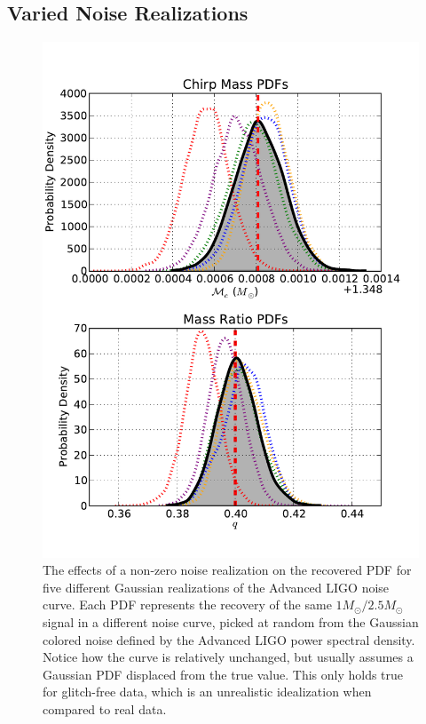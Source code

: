 \documentclass[11pt,a4paper]{emulateapj}
\begin{document}
\subsection{Varied Noise Realizations}
\label{noiseSection}

\begin{figure}[ht!]
  \centering
 \includegraphics[trim=0cm 0cm 0cm 0cm, clip=true,scale=0.59]{noisePDF.pdf}
 \caption{The effects of a non-zero noise realization on the recovered PDF for five different Gaussian realizations of the Advanced LIGO noise curve.  Each PDF represents the recovery of the same $1M_{\odot}/2.5M_{\odot}$ signal in a different noise curve, picked at random from the Gaussian colored noise defined by the Advanced LIGO power spectral density.  Notice how the curve is relatively unchanged, but usually assumes a Gaussian PDF displaced from the true value.  This only holds true for glitch-free data, which is an unrealistic idealization when compared to real data.}
 \label{noisePDFs}
\end{figure}
  
\end{document}
